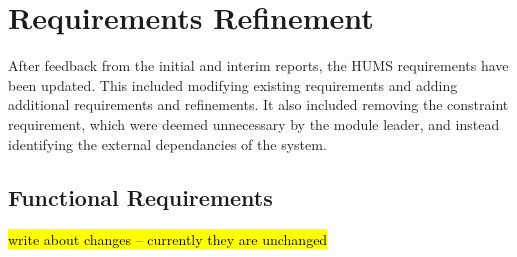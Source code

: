 \documentclass[10pt,a4paper]{article}
\begin{document}
\section{Requirements Refinement}
\label{sec:requirements}
After feedback from the initial and interim reports, the HUMS requirements have been updated. This included modifying existing requirements and adding additional requirements and refinements. It also included removing the constraint requirement, which were deemed unnecessary by the module leader, and instead identifying the external dependancies of the system.

\subsection{Functional Requirements}
\label{sec:functional_requirements}
\hl{write about changes -- currently they are unchanged} 
\end{document}
